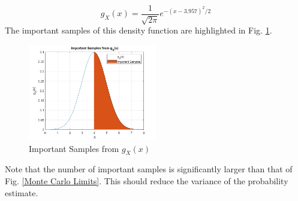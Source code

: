 \documentclass[conference]{IEEEtran}
\begin{document}
\begin{equation}
g_X(x) = \frac{1}{\sqrt{2\pi}}e^{-(x-3.957)^2/2}
\end{equation}
The important samples of this density function are highlighted in Fig. \ref{Important Samples}. 
\begin{figure}[H]
\centerline{\includegraphics[width=0.5\textwidth]{Important_Samples.png}}
\caption{Important Samples from $g_X(x)$}
\label{Important Samples}
\end{figure}
Note that the number of important samples is significantly larger than that of Fig. \ref{Monte Carlo Limits}. This should reduce the variance of the probability estimate.
\end{document}
